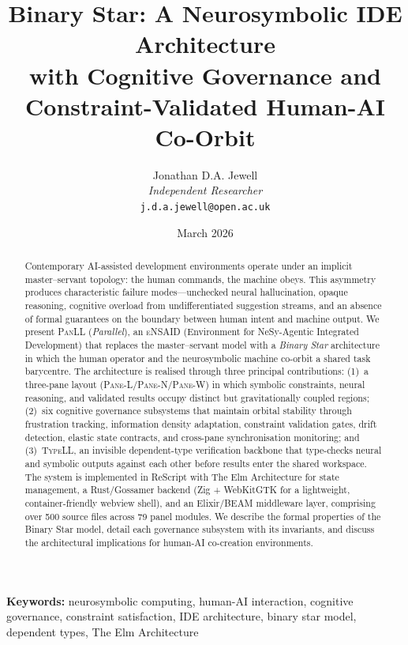 \documentclass[11pt,a4paper]{article}
\title{Binary Star: A Neurosymbolic IDE Architecture\\with Cognitive Governance and\\Constraint-Validated Human-AI Co-Orbit}
\author{Jonathan D.A. Jewell\\
\textit{Independent Researcher}\\
\texttt{j.d.a.jewell@open.ac.uk}}
\date{March 2026}
\newcommand{\paneL}{\textsc{Pane-L}}
\newcommand{\paneN}{\textsc{Pane-N}}
\newcommand{\paneW}{\textsc{Pane-W}}
\newcommand{\panll}{\textsc{PanLL}}
\newcommand{\typell}{\textsc{TypeLL}}
\newcommand{\ensaid}{\textsc{eNSAID}}
\begin{document}
\maketitle

\begin{abstract}
Contemporary AI-assisted development environments operate under an
implicit master--servant topology: the human commands, the machine
obeys. This asymmetry produces characteristic failure modes---unchecked
neural hallucination, opaque reasoning, cognitive overload from
undifferentiated suggestion streams, and an absence of formal
guarantees on the boundary between human intent and machine output.
We present \panll{} (\textit{Parallel}), an \ensaid{} (Environment
for NeSy-Agentic Integrated Development) that replaces the
master--servant model with a \textit{Binary Star} architecture in
which the human operator and the neurosymbolic machine co-orbit a
shared task barycentre. The architecture is realised through three
principal contributions: (1)~a three-pane layout (\paneL{}/\paneN{}/\paneW{})
in which symbolic constraints, neural reasoning, and validated results
occupy distinct but gravitationally coupled regions; (2)~six cognitive
governance subsystems that maintain orbital stability through
frustration tracking, information density adaptation, constraint
validation gates, drift detection, elastic state contracts, and
cross-pane synchronisation monitoring; and (3)~\typell{}, an invisible
dependent-type verification backbone that type-checks neural and
symbolic outputs against each other before results enter the shared
workspace. The system is implemented in ReScript with The Elm
Architecture for state management, a Rust/Gossamer backend (Zig + WebKitGTK for a lightweight,
container-friendly webview shell), and an
Elixir/BEAM middleware layer, comprising over 500 source files across
79 panel modules. We describe the formal properties of the Binary Star
model, detail each governance subsystem with its invariants, and
discuss the architectural implications for human-AI co-creation
environments.
\end{abstract}

\vspace{0.5em}
\noindent\textbf{Keywords:} neurosymbolic computing, human-AI interaction,
cognitive governance, constraint satisfaction, IDE architecture,
binary star model, dependent types, The Elm Architecture
\end{document}
